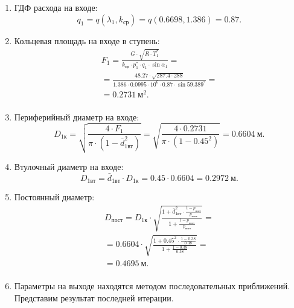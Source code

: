 \documentclass[a4paper,12pt]{article}
\begin{document}
\begin{enumerate}
        \item ГДФ расхода на входе:
        \[
            q_1 = q(\lambda_1, k_{ср}) = q(0.6698, 1.386) = 
            0.87.
        \]

        \item Кольцевая площадь на входе в ступень:
        \begin{gather*}
            F_1 = \frac{ G \cdot \sqrt{R \cdot T_1^*} }{ k_{ср} \cdot p_1^* \cdot q_1 \cdot \sin{\alpha_1} } =\\
            =\frac{ 
                48.27 \cdot \sqrt{ 287.4 \cdot 288}
            }{ 
                1.386 \cdot 0.0995 \cdot 10^6 \cdot 0.87 
                \cdot \sin{59.389^\circ} 
            } =\\
            =0.2731\ м^2.\\
        \end{gather*}

        \item Периферийный диаметр на входе:
        \[
            D_{1к} = \sqrt{ \frac{ 4 \cdot F_1 }{ \pi \cdot (1 - \bar{d}_{1вт}^2) } } = 
            \sqrt{ \frac{ 
                    4 \cdot 0.2731 
                }{ 
                    \pi \cdot (1 - 0.45^2) 
            } } = 
            0.6604\ м.
        \]

        \item Втулочный диаметр на входе:
        \[
            D_{1вт} = \bar{d}_{1вт} \cdot D_{1к} = 
            0.45 \cdot 0.6604 = 
            0.2972\ м.
        \]

        \item Постоянный диаметр:
        \begin{gather*}
            D_{пост} = D_{1к} \cdot 
                \sqrt{ \frac{ 
                        1 + \bar{d}_{1вт}^2 \cdot \frac{ 1 - p_{пост} }{ p_{пост} }  
                    }{
                        1 + \frac{ 1 - p_{пост} }{ p_{пост}}
                } } =\\
            =0.6604 \cdot 
                \sqrt{ \frac{ 
                        1 + 0.45^2 \cdot 
                        \frac{ 1 - 0.38 }{ 0.38 }  
                    }{
                        1 + \frac{ 1 - 0.38 }{ 0.38}
                } } =\\
                =0.4695\ м.\\  
        \end{gather*}

        \item Параметры на выходе находятся методом последовательных приближений. Представим результат последней итерации.
        \begin{enumerate}


\end{enumerate}
\end{enumerate}
\end{document}
